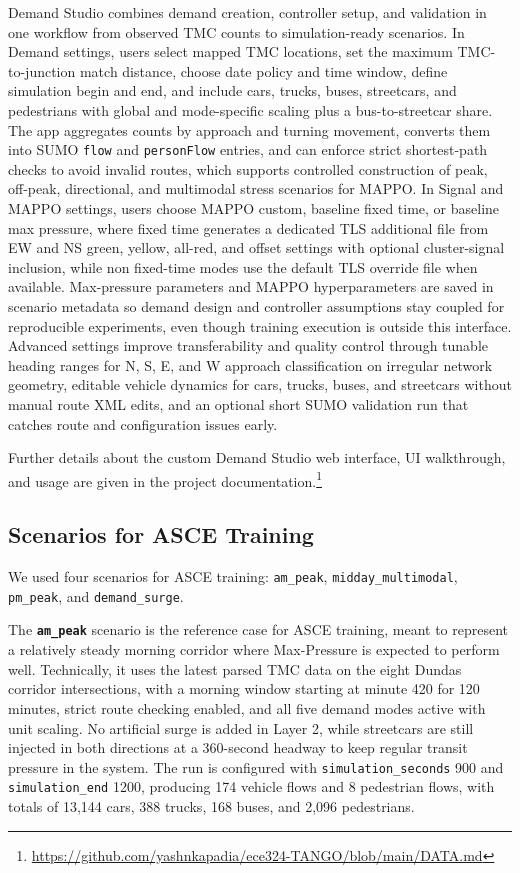 \documentclass{article}
\begin{document}
Demand Studio combines demand creation, controller setup, and validation in one workflow from observed TMC counts to simulation-ready scenarios. In Demand settings, users select mapped TMC locations, set the maximum TMC-to-junction match distance, choose date policy and time window, define simulation begin and end, and include cars, trucks, buses, streetcars, and pedestrians with global and mode-specific scaling plus a bus-to-streetcar share. The app aggregates counts by approach and turning movement, converts them into SUMO \texttt{flow} and \texttt{personFlow} entries, and can enforce strict shortest-path checks to avoid invalid routes, which supports controlled construction of peak, off-peak, directional, and multimodal stress scenarios for MAPPO. In Signal and MAPPO settings, users choose MAPPO custom, baseline fixed time, or baseline max pressure, where fixed time generates a dedicated TLS additional file from EW and NS green, yellow, all-red, and offset settings with optional cluster-signal inclusion, while non fixed-time modes use the default TLS override file when available. Max-pressure parameters and MAPPO hyperparameters are saved in scenario metadata so demand design and controller assumptions stay coupled for reproducible experiments, even though training execution is outside this interface. Advanced settings improve transferability and quality control through tunable heading ranges for N, S, E, and W approach classification on irregular network geometry, editable vehicle dynamics for cars, trucks, buses, and streetcars without manual route XML edits, and an optional short SUMO validation run that catches route and configuration issues early.

Further details about the custom Demand Studio web interface, UI walkthrough, and usage are given in the project documentation.\footnote{\url{https://github.com/yashnkapadia/ece324-TANGO/blob/main/DATA.md}}

\subsection{Scenarios for ASCE Training}
\label{sec:scenarios}

We used four scenarios for ASCE training: \texttt{am\_peak}, \texttt{midday\_multimodal}, \texttt{pm\_peak}, and \texttt{demand\_surge}.

The \textbf{\texttt{am\_peak}} scenario is the reference case for ASCE training, meant to represent a relatively steady morning corridor where Max-Pressure is expected to perform well. Technically, it uses the latest parsed TMC data on the eight Dundas corridor intersections, with a morning window starting at minute 420 for 120 minutes, strict route checking enabled, and all five demand modes active with unit scaling. No artificial surge is added in Layer 2, while streetcars are still injected in both directions at a 360-second headway to keep regular transit pressure in the system. The run is configured with \texttt{simulation\_seconds} 900 and \texttt{simulation\_end} 1200, producing 174 vehicle flows and 8 pedestrian flows, with totals of 13{,}144 cars, 388 trucks, 168 buses, and 2{,}096 pedestrians.
\end{document}
